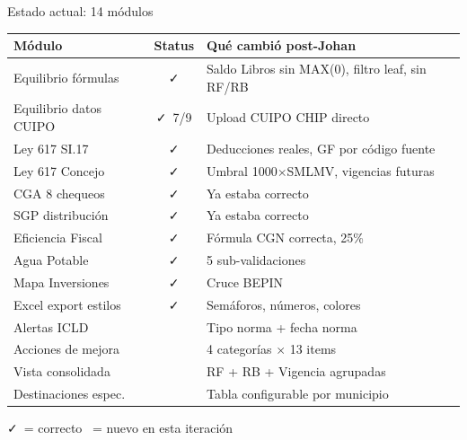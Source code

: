 \documentclass[aspectratio=169,11pt]{beamer}
\newcommand{\cmark}{\textcolor{verde}{\faCheck}}
\newcommand{\nmark}{\textcolor{azul}{\faPlusCircle}}
\begin{document}
\begin{frame}{Estado actual: 14 m\'odulos}
\vspace{-4pt}
\scriptsize
\begin{center}
\renewcommand{\arraystretch}{1.1}
\begin{tabular}{l c l}
\toprule
\textbf{M\'odulo} & \textbf{Status} & \textbf{Qu\'e cambi\'o post-Johan} \\
\midrule
Equilibrio f\'ormulas & \cmark & Saldo Libros sin MAX(0), filtro leaf, sin RF/RB \\
Equilibrio datos CUIPO & \cmark\ 7/9 & Upload CUIPO CHIP directo \\
Ley 617 SI.17 & \cmark & Deducciones reales, GF por c\'odigo fuente \\
Ley 617 Concejo & \cmark & Umbral 1000$\times$SMLMV, vigencias futuras \\
CGA 8 chequeos & \cmark & Ya estaba correcto \\
SGP distribuci\'on & \cmark & Ya estaba correcto \\
Eficiencia Fiscal & \cmark & F\'ormula CGN correcta, 25\% \\
Agua Potable & \cmark & 5 sub-validaciones \\
Mapa Inversiones & \cmark & Cruce BEPIN \\
Excel export estilos & \cmark & Sem\'aforos, n\'umeros, colores \\
\rowcolor{azul!8}
Alertas ICLD & \nmark & Tipo norma + fecha norma \\
\rowcolor{azul!8}
Acciones de mejora & \nmark & 4 categor\'ias $\times$ 13 items \\
\rowcolor{azul!8}
Vista consolidada & \nmark & RF + RB + Vigencia agrupadas \\
\rowcolor{azul!8}
Destinaciones espec. & \nmark & Tabla configurable por municipio \\
\bottomrule
\end{tabular}
\end{center}
\vspace{2pt}
\centering
\cmark\ = correcto \quad \nmark\ = nuevo en esta iteraci\'on
\end{frame}
\end{document}
